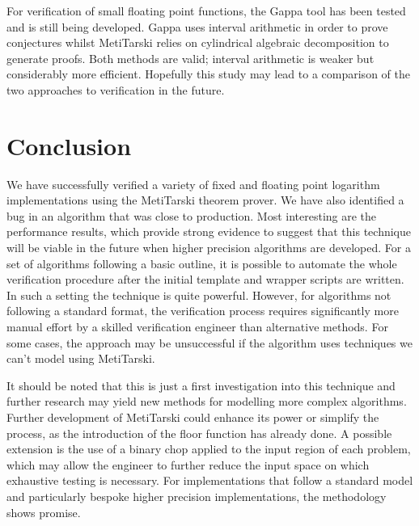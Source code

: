 \documentclass[a4]{article}
\begin{document}
For verification of small floating point functions, the Gappa tool \cite{de2006assisted,boldo2009combining} has been tested and is still being developed. Gappa uses interval arithmetic in order to prove conjectures whilst MetiTarski relies on cylindrical algebraic decomposition to generate proofs. Both methods are valid; interval arithmetic is weaker but considerably more efficient. Hopefully this study may lead to a comparison of the two approaches to verification in the future.

\section{Conclusion}
We have successfully verified a variety of fixed and floating point logarithm implementations using the MetiTarski theorem prover.
We have also identified a bug in an algorithm that was close to production. Most interesting are the performance results, which provide strong evidence to suggest that this technique will be viable in the future when higher precision algorithms are developed. For a set of algorithms following a basic outline, it is possible to automate the whole verification procedure after the initial template and wrapper scripts are written. In such a setting the technique is quite powerful. However, for algorithms not following a standard format, the verification process requires significantly more manual effort by a skilled verification engineer than alternative methods. For some cases, the approach may be unsuccessful if the algorithm uses techniques we can't model using MetiTarski. 

It should be noted that this is just a first investigation into this technique and further research may yield new methods for modelling more complex algorithms. Further development of MetiTarski could enhance its power or simplify the process, as the introduction of the floor function has already done. A possible extension is the use of a binary chop applied to the input region of each problem, which may allow the engineer to further reduce the input space on which exhaustive testing is necessary. For implementations that follow a standard model and particularly bespoke higher precision implementations, the methodology shows promise.


\end{document}
